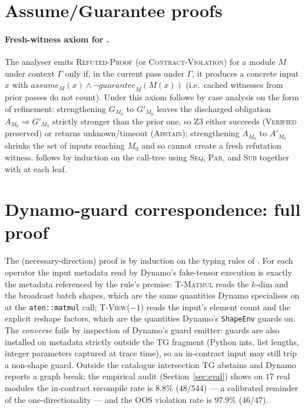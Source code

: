 \section{Assume/Guarantee proofs}
\label{app:ag-proofs}

\paragraph{Fresh-witness axiom for .}
The analyser emits \textsc{Refuted-Proof} (or
\textsc{Contract-Violation}) for a module $M$ under
context $\Gamma$ only if, in the current pass under $\Gamma$,
it produces a concrete input $x$ with
$\mathit{assume}_M(x)\wedge\neg\mathit{guarantee}_M(M(x))$
(i.e.\ cached witnesses from prior passes do not count). Under
this axiom  follows by case analysis on
the form of refinement: strengthening $G_{M_0}$ to
$G'_{M_0}$ leaves the discharged obligation
$A_{M_0}\Rightarrow G'_{M_0}$ strictly stronger than the prior
one, so Z3 either succeeds (\textsc{Verified} preserved) or
returns unknown/timeout (\textsc{Abstain}); strengthening
$A_{M_0}$ to $A'_{M_0}$ shrinks the set of inputs reaching
$M_0$ and so cannot create a fresh refutation witness.
 follows by induction on the call-tree using
\textsc{Seq}, \textsc{Par}, and \textsc{Sub} together with
 at each leaf.

\section{Dynamo-guard correspondence: full proof}
\label{app:dynamo-proof}

The (necessary-direction) proof is by induction on the typing
rules of . For each operator the input
metadata read by Dynamo's fake-tensor execution is exactly the
metadata referenced by the rule's premise: \textsc{T-Matmul}
reads the $k$-dim and the broadcast batch shapes, which are the
same quantities Dynamo specialises on at the
\texttt{aten::matmul} call; \textsc{T-View($-1$)} reads the
input's element count and the explicit reshape factors, which
are the quantities Dynamo's \texttt{ShapeEnv} guards on. The
\emph{converse} fails by inspection of Dynamo's guard emitter:
guards are also installed on metadata strictly outside the
\textsc{TG} fragment (Python ints, list lengths, integer
parameters captured at trace time), so an in-contract input may
still trip a non-shape guard. Outside the catalogue intersection
\textsc{TG} abstains and Dynamo reports a graph break; the
empirical audit (Section~\ref{sec:eval}) shows on $17$ real
modules the in-contract recompile rate is $8.8\%$
($48/544$) --- a calibrated reminder of the
one-directionality --- and the OOS violation rate is $97.9\%$
($46/47$).

